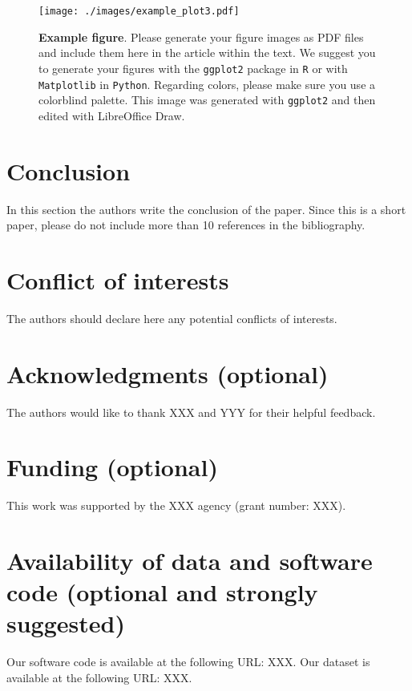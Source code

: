 \documentclass[12pt,a4paper]{cibb}
\begin{document}
\begin{figure}[h]
\vspace{3mm}
 \begin{center}
 \texttt{[image: ./images/example\_plot3.pdf]}
\caption{\textbf{Example figure}.
Please generate your figure images as PDF files and include them here in the article within the text.
We suggest you to generate your figures with the \texttt{ggplot2} package in \texttt{R} or with \texttt{Matplotlib} in \texttt{Python}.
Regarding colors, please make sure you use a colorblind palette.
This image was generated with \texttt{ggplot2} and then edited with LibreOffice Draw.
\label{fig:LOGO}}
 \end{center}
\vspace{-8mm}
\end{figure}

\section{Conclusion}
\label{sec:CONCLUSIONS}


In this section the authors write the conclusion of the paper. Since this is a short paper, please do not include more than 10 references in the bibliography.


\section*{Conflict of interests}
\label{sec:CONFLICT-OF-INTERESTS}
The authors should declare here any potential conflicts of interests.

\section*{Acknowledgments (optional)}
\label{sec:ACKNOWLEDGMENTS}
The authors would like to thank XXX and YYY for their helpful feedback.

\section*{Funding (optional)}
\label{sec:FUNDING}
This work was supported by the XXX agency (grant number: XXX).

\section*{Availability of data and software code (optional and strongly suggested)}
\label{sec:AVAILABILITY}
Our software code is available at the following URL: XXX.
\newline
\indent Our dataset is available at the following URL: XXX.


\footnotesize

 
\normalsize
\end{document}
